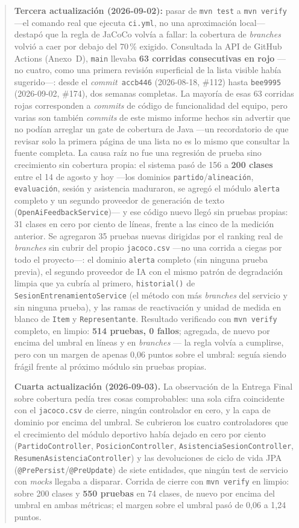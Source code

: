 \documentclass[11pt,a4paper]{article}
\newcommand{\ruta}[1]{\texttt{\footnotesize #1}}
\begin{document}
\begin{quote}
\textbf{Tercera actualización (2026-09-02):} pasar de \texttt{mvn test} a
\texttt{mvn verify} —el comando real que ejecuta \ruta{ci.yml}, no una
aproximación local— destapó que la regla de JaCoCo volvía a fallar:
la cobertura de \emph{branches} volvió a caer por debajo del 70\,\%
exigido. Consultada la API de GitHub Actions (Anexo~D), \texttt{main} llevaba
\textbf{63 corridas consecutivas en rojo} —no cuatro, como una primera
revisión superficial de la lista visible había sugerido—: desde el
\emph{commit}~\texttt{accb446} (2026-08-18, \#112) hasta
\texttt{bee9995} (2026-09-02, \#174), dos semanas completas. La
mayoría de esas 63 corridas rojas corresponden a \emph{commits} de
código de funcionalidad del equipo, pero varias son también
\emph{commits} de este mismo informe hechos sin advertir que no podían
arreglar un gate de cobertura de Java —un recordatorio de que revisar
solo la primera página de una lista no es lo mismo que consultar la
fuente completa. La causa raíz no fue una regresión de
prueba sino crecimiento sin cobertura propia: el sistema pasó de 156 a
\textbf{200 clases} entre el 14 de agosto y hoy —los dominios
\texttt{partido}/\texttt{alineación}, \texttt{evaluación}, sesión y
asistencia maduraron, se agregó el módulo \texttt{alerta} completo y un
segundo proveedor de generación de texto (\texttt{OpenAiFeedbackService})—
y ese código nuevo llegó sin pruebas propias: 31 clases en cero por
ciento de líneas, frente a las cinco de la medición anterior. Se
agregaron 35 pruebas nuevas dirigidas por el ranking real de
\emph{branches} sin cubrir del propio \texttt{jacoco.csv} —no una
corrida a ciegas por todo el proyecto—: el dominio \texttt{alerta}
completo (sin ninguna prueba previa), el segundo proveedor de IA con el
mismo patrón de degradación limpia que ya cubría al primero,
\texttt{historial()} de \texttt{SesionEntrenamientoService} (el método
con más \emph{branches} del servicio y sin ninguna prueba), y las ramas
de reactivación y unidad de medida en blanco de \texttt{Item} y
\texttt{Representante}. Resultado verificado con \texttt{mvn verify}
completo, en limpio: \textbf{514 pruebas, 0 fallos}; agregada, de nuevo
por encima del umbral en líneas y en \emph{branches} — la regla volvía
a cumplirse, pero con un margen de apenas 0,06 puntos sobre el umbral:
seguía siendo frágil frente al próximo módulo sin pruebas propias.

\textbf{Cuarta actualización (2026-09-03).} La observación de la Entrega
Final sobre cobertura pedía tres cosas comprobables: una sola cifra
coincidente con el \texttt{jacoco.csv} de cierre, ningún controlador en
cero, y la capa de dominio por encima del umbral. Se cubrieron los
cuatro controladores que el crecimiento del módulo deportivo había
dejado en cero por ciento (\texttt{PartidoController},
\texttt{PosicionController}, \texttt{AsistenciaSesionController},
\texttt{ResumenAsistenciaController}) y las devoluciones de ciclo de
vida JPA (\texttt{@PrePersist}/\texttt{@PreUpdate}) de siete entidades,
que ningún test de servicio con \emph{mocks} llegaba a disparar. Corrida
de cierre con \texttt{mvn verify} en limpio: sobre 200 clases y
\textbf{550 pruebas} en 74 clases, de nuevo por encima del umbral en
ambas métricas; el margen sobre el umbral pasó de 0,06 a 1,24 puntos.


\end{quote}
\end{document}
